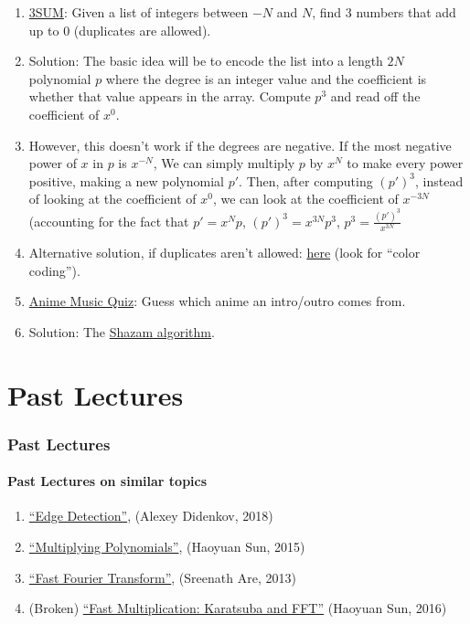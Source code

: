 \documentclass{beamer}                             %
\begin{document}
\begin{frame}
\begin{enumerate}
  \item \href{https://en.wikipedia.org/wiki/3SUM}{3SUM}:
    Given a list of integers between \( -N \) and \( N \),
    find 3 numbers that add up to 0 (duplicates are allowed). 
    \addtocounter{enumi}{-1}
  \item Solution: The basic idea will be to encode the list into a length \( 2N \)
    polynomial \( p \) where the degree is an integer value and the coefficient
    is whether that value appears in the array.
    Compute \( p^3 \) and read off the coefficient of \( x^0 \).
    \addtocounter{enumi}{-1}
  \item However, this doesn't work if the degrees are negative. If the most
    negative power of \( x \) in \( p \) is \( x^{-N} \), We can simply multiply
    \( p \) by \( x^N \) to make every power positive, making a new polynomial
    \( p' \). Then, after computing \( (p')^3 \), instead of looking at the
    coefficient of \( x^0 \), we can look at the coefficient of \( x^{-3N} \)
    (accounting for the fact that \( p' = x^N p \), \( (p')^3 = x^{3N} p^3 \),
    \( p^3 = \frac{(p')^3}{x^{3N}} \)
    \addtocounter{enumi}{-1}
  \item Alternative solution, if duplicates aren't allowed:
    \href{https://cs.stanford.edu/~rishig/courses/ref/l16.txt}{here}
    (look for \enquote{color coding}).

  \item \href{https://animemusicquiz.com/}{Anime Music Quiz}:
    Guess which anime an intro/outro comes from.
    \addtocounter{enumi}{-1}
  \item Solution: The \href{https://www.toptal.com/algorithms/shazam-it-music-processing-fingerprinting-and-recognition}
    {Shazam algorithm}.
\end{enumerate}
\end{frame}

\section{Past Lectures}

\begin{frame}
\frametitle{Past Lectures}
\framesubtitle{Past Lectures on similar topics}
\begin{enumerate}
  \item \href{https://activities.tjhsst.edu/computervision/lectures/Edge_Detection.pdf}
    {\enquote{Edge Detection}}, (Alexey Didenkov, 2018)
  \item \href{https://activities.tjhsst.edu/sct/lectures/1415/SCT_Multiplying_Polynomials.pdf}
    {\enquote{Multiplying Polynomials}}, (Haoyuan Sun, 2015)
  \item \href{https://activities.tjhsst.edu/sct/lectures/1213/fft.pdf}
    {\enquote{Fast Fourier Transform}}, (Sreenath Are, 2013)
  \item (Broken) \href{https://activities.tjhsst.edu/sct/lectures/1516/SCT_Polynomial.pdf}
    {\enquote{Fast Multiplication: Karatsuba and FFT}} (Haoyuan Sun, 2016)
\end{enumerate}
\end{frame}
\end{document}

